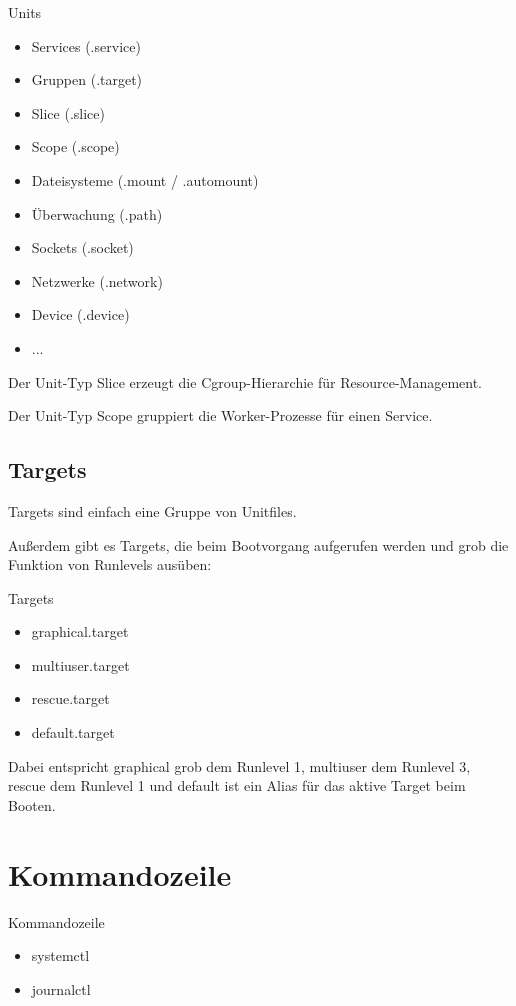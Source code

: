 \begin{frame}{Units}
  \begin{itemize}
  \item Services (.service)
  \item Gruppen (.target)
  \item Slice (.slice)
  \item Scope (.scope)
  \item Dateisysteme (.mount / .automount)
  \item Überwachung (.path)
  \item Sockets (.socket)
  \item Netzwerke (.network)
  \item Device (.device)
  \item ...
\end{itemize}
\end{frame}

Der Unit-Typ Slice erzeugt die Cgroup-Hierarchie für Resource-Management.

Der Unit-Typ Scope gruppiert die Worker-Prozesse für einen Service.

\subsection{Targets}
Targets sind einfach eine Gruppe von Unitfiles.

Außerdem gibt es Targets, die beim Bootvorgang aufgerufen werden und grob
die Funktion von Runlevels ausüben:

\begin{frame}[fragile]{Targets}
  \begin{itemize}
  \item graphical.target
  \item multiuser.target
  \item rescue.target
  \item default.target
  \end{itemize}
\end{frame}

Dabei entspricht graphical grob dem Runlevel 1, multiuser dem Runlevel 3,
rescue dem Runlevel 1 und default ist ein Alias für das aktive Target
beim Booten.

\section{Kommandozeile}

\begin{frame}{Kommandozeile}
  \begin{itemize}
  \item systemctl
  \item journalctl
  \end{itemize}
\end{frame}


